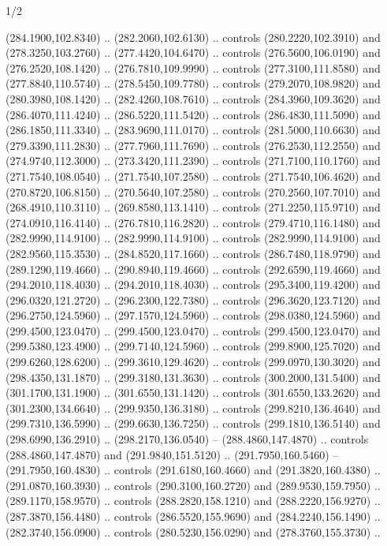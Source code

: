 \begin{flagdescription}{1/2}
\begin{scope}[xshift=0.5\flaglength]
\begin{scope}[scale=0.004\flagwidth,xshift=-90mm,yshift=89mm]
\begin{scope}[y=0.80pt, x=0.80pt, yscale=-1, xscale=1, inner sep=0pt, outer sep=0pt]
  (284.1900,102.8340) .. (282.2060,102.6130) .. controls (280.2220,102.3910) and
  (278.3250,103.2760) .. (277.4420,104.6470) .. controls (276.5600,106.0190) and
  (276.2520,108.1420) .. (276.7810,109.9990) .. controls (277.3100,111.8580) and
  (277.8840,110.5740) .. (278.5450,109.7780) .. controls (279.2070,108.9820) and
  (280.3980,108.1420) .. (282.4260,108.7610) .. controls (284.3960,109.3620) and
  (286.4070,111.4240) .. (286.5220,111.5420) .. controls (286.4830,111.5090) and
  (286.1850,111.3340) .. (283.9690,111.0170) .. controls (281.5000,110.6630) and
  (279.3390,111.2830) .. (277.7960,111.7690) .. controls (276.2530,112.2550) and
  (274.9740,112.3000) .. (273.3420,111.2390) .. controls (271.7100,110.1760) and
  (271.7540,108.0540) .. (271.7540,107.2580) .. controls (271.7540,106.4620) and
  (270.8720,106.8150) .. (270.5640,107.2580) .. controls (270.2560,107.7010) and
  (268.4910,110.3110) .. (269.8580,113.1410) .. controls (271.2250,115.9710) and
  (274.0910,116.4140) .. (276.7810,116.2820) .. controls (279.4710,116.1480) and
  (282.9990,114.9100) .. (282.9990,114.9100) .. controls (282.9990,114.9100) and
  (282.9560,115.3530) .. (284.8520,117.1660) .. controls (286.7480,118.9790) and
  (289.1290,119.4660) .. (290.8940,119.4660) .. controls (292.6590,119.4660) and
  (294.2010,118.4030) .. (294.2010,118.4030) .. controls (295.3400,119.4200) and
  (296.0320,121.2720) .. (296.2300,122.7380) .. controls (296.3620,123.7120) and
  (296.2750,124.5960) .. (297.1570,124.5960) .. controls (298.0380,124.5960) and
  (299.4500,123.0470) .. (299.4500,123.0470) .. controls (299.4500,123.0470) and
  (299.5380,123.4900) .. (299.7140,124.5960) .. controls (299.8900,125.7020) and
  (299.6260,128.6200) .. (299.3610,129.4620) .. controls (299.0970,130.3020) and
  (298.4350,131.1870) .. (299.3180,131.3630) .. controls (300.2000,131.5400) and
  (301.1700,131.1900) .. (301.6550,131.1420) .. controls (301.6550,133.2620) and
  (301.2300,134.6640) .. (299.9350,136.3180) .. controls (299.8210,136.4640) and
  (299.7310,136.5990) .. (299.6630,136.7250) .. controls (299.1810,136.5140) and
  (298.6990,136.2910) .. (298.2170,136.0540) -- (288.4860,147.4870) .. controls
  (288.4860,147.4870) and (291.9840,151.5120) .. (291.7950,160.5460) --
  (291.7950,160.4830) .. controls (291.6180,160.4660) and (291.3820,160.4380) ..
  (291.0870,160.3930) .. controls (290.3100,160.2720) and (289.9530,159.7950) ..
  (289.1170,158.9570) .. controls (288.2820,158.1210) and (288.2220,156.9270) ..
  (287.3870,156.4480) .. controls (286.5520,155.9690) and (284.2240,156.1490) ..
  (282.3740,156.0900) .. controls (280.5230,156.0290) and (278.3760,155.3730) ..

\end{scope}
\end{scope}
\end{scope}
\end{flagdescription}
